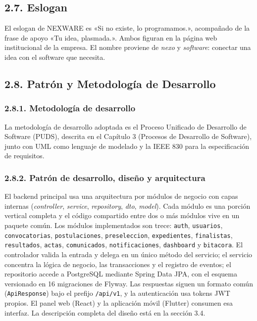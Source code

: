\subsection{2.7. Eslogan}

El eslogan de NEXWARE es «Si no existe, lo programamos.», acompañado de la frase de apoyo «Tu idea, plasmada.». Ambos figuran en la página web institucional de la empresa. El nombre proviene de \textit{nexo} y \textit{software}: conectar una idea con el software que necesita.

\subsection{2.8. Patrón y Metodología de Desarrollo}

\subsubsection{2.8.1. Metodología de desarrollo}

La metodología de desarrollo adoptada es el Proceso Unificado de Desarrollo de Software (PUDS), descrita en el Capítulo 3 (Procesos de Desarrollo de Software), junto con UML como lenguaje de modelado y la IEEE 830 para la especificación de requisitos.

\subsubsection{2.8.2. Patrón de desarrollo, diseño y arquitectura}

El backend principal usa una arquitectura por módulos de negocio con capas internas (\textit{controller}, \textit{service}, \textit{repository}, \textit{dto}, \textit{model}). Cada módulo es una porción vertical completa y el código compartido entre dos o más módulos vive en un paquete común. Los módulos implementados son trece: \texttt{auth}, \texttt{usuarios}, \texttt{convocatorias}, \texttt{postulaciones}, \texttt{preseleccion}, \texttt{expedientes}, \texttt{finalistas}, \texttt{resultados}, \texttt{actas}, \texttt{comunicados}, \texttt{notificaciones}, \texttt{dashboard} y \texttt{bitacora}. El controlador valida la entrada y delega en un único método del servicio; el servicio concentra la lógica de negocio, las transacciones y el registro de eventos; el repositorio accede a PostgreSQL mediante Spring Data JPA, con el esquema versionado en 16 migraciones de Flyway. Las respuestas siguen un formato común (\texttt{ApiResponse}) bajo el prefijo \texttt{/api/v1}, y la autenticación usa tokens JWT propios. El panel web (React) y la aplicación móvil (Flutter) consumen esa interfaz. La descripción completa del diseño está en la sección 3.4.

